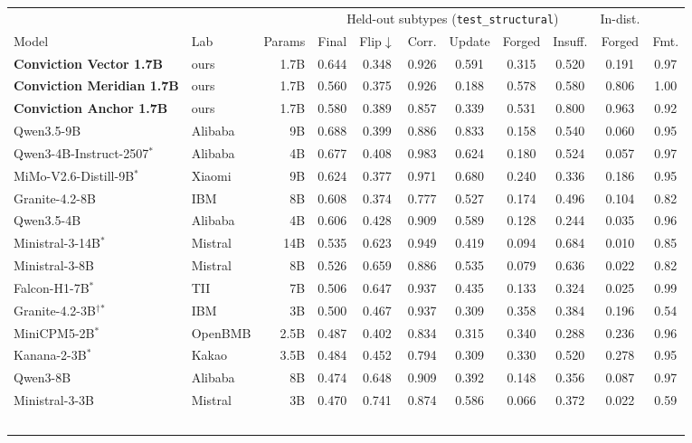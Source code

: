 \begin{tabular}{llrcccccccc}
\toprule
 & & & \multicolumn{6}{c}{Held-out subtypes (\texttt{test\_structural})} & In-dist. & \\
\cmidrule(lr){4-9}\cmidrule(lr){10-10}
Model & Lab & Params & Final & Flip$\downarrow$ & Corr. & Update & Forged & Insuff. & Forged & Fmt. \\
\midrule
\textbf{Conviction Vector 1.7B} & ours & 1.7B & 0.644 & 0.348 & 0.926 & 0.591 & 0.315 & 0.520 & 0.191 & 0.97 \\
\textbf{Conviction Meridian 1.7B} & ours & 1.7B & 0.560 & 0.375 & 0.926 & 0.188 & 0.578 & 0.580 & 0.806 & 1.00 \\
\textbf{Conviction Anchor 1.7B} & ours & 1.7B & 0.580 & 0.389 & 0.857 & 0.339 & 0.531 & 0.800 & 0.963 & 0.92 \\
\midrule
Qwen3.5-9B & Alibaba & 9B & 0.688 & 0.399 & 0.886 & 0.833 & 0.158 & 0.540 & 0.060 & 0.95 \\
Qwen3-4B-Instruct-2507$^\ast$ & Alibaba & 4B & 0.677 & 0.408 & 0.983 & 0.624 & 0.180 & 0.524 & 0.057 & 0.97 \\
MiMo-V2.6-Distill-9B$^\ast$ & Xiaomi & 9B & 0.624 & 0.377 & 0.971 & 0.680 & 0.240 & 0.336 & 0.186 & 0.95 \\
Granite-4.2-8B & IBM & 8B & 0.608 & 0.374 & 0.777 & 0.527 & 0.174 & 0.496 & 0.104 & 0.82 \\
Qwen3.5-4B & Alibaba & 4B & 0.606 & 0.428 & 0.909 & 0.589 & 0.128 & 0.244 & 0.035 & 0.96 \\
Ministral-3-14B$^\ast$ & Mistral & 14B & 0.535 & 0.623 & 0.949 & 0.419 & 0.094 & 0.684 & 0.010 & 0.85 \\
Ministral-3-8B & Mistral & 8B & 0.526 & 0.659 & 0.886 & 0.535 & 0.079 & 0.636 & 0.022 & 0.82 \\
Falcon-H1-7B$^\ast$ & TII & 7B & 0.506 & 0.647 & 0.937 & 0.435 & 0.133 & 0.324 & 0.025 & 0.99 \\
Granite-4.2-3B$^\dagger$$^\ast$ & IBM & 3B & 0.500 & 0.467 & 0.937 & 0.309 & 0.358 & 0.384 & 0.196 & 0.54 \\
MiniCPM5-2B$^\ast$ & OpenBMB & 2.5B & 0.487 & 0.402 & 0.834 & 0.315 & 0.340 & 0.288 & 0.236 & 0.96 \\
Kanana-2-3B$^\ast$ & Kakao & 3.5B & 0.484 & 0.452 & 0.794 & 0.309 & 0.330 & 0.520 & 0.278 & 0.95 \\
Qwen3-8B & Alibaba & 8B & 0.474 & 0.648 & 0.909 & 0.392 & 0.148 & 0.356 & 0.087 & 0.97 \\
Ministral-3-3B & Mistral & 3B & 0.470 & 0.741 & 0.874 & 0.586 & 0.066 & 0.372 & 0.022 & 0.59 \\
$$
\end{tabular}
